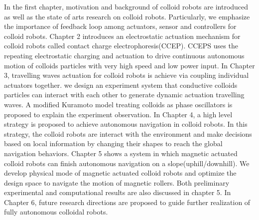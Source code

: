 In the first chapter, motivation and background of colloid robots are introduced as well as the state of arts research on colloid robots. Particularly, we emphasize the importance of feedback loop among actuators, sensor and controllers for colloid robots. Chapter 2 introduces an electrostatic actuation mechanism for colloid robots called contact charge electrophoresis(CCEP). CCEPS uses the repeating electrostatic charging and actuation to drive   
continuous autonomous motion of colloids particles with very high speed and low power input. In Chapter 3, travelling waves actuation for colloid robots is achieve via coupling individual actuators together.  we  design an experiment system that conductive  colloids particles can interact with each other to generate dynamic actuation travelling waves. A modified Kuramoto model treating colloids as phase oscillators is proposed to explain the experiment observation. In Chapter 4, a high level strategy is proposed to achieve autonomous navigation in colloid robots. In this strategy, the colloid robots are interact with the environment and make decisions based on local information by changing their shapes to reach the global navigation behaviors.  Chapter 5  shows a system in which  magnetic actuated colloid robots can  finish autonomous navigation on a slope(uphill/downhill). We develop physical mode of  magnetic actuated colloid robots and optimize the design space to navigate the motion of magnetic rollers.  Both preliminary experimental and computational results are also discussed in chapter 5. In Chapter 6, future research directions  are proposed  to guide  further realization of  fully autonomous colloidal robots. 

